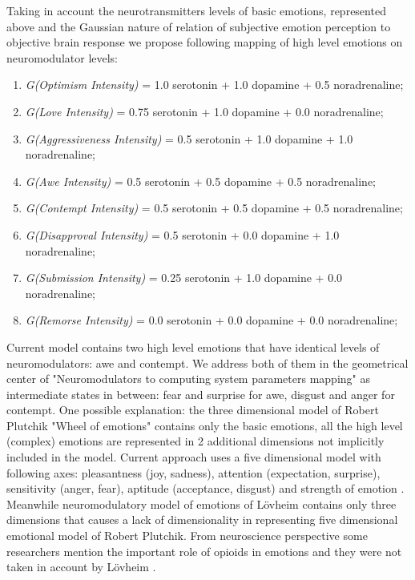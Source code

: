 Taking in account the neurotransmitters levels of basic emotions, represented above and the Gaussian nature of relation of subjective emotion perception to objective brain response \cite{senticcomputing, neuralcorrelatesofhate, emotionsbraintorobot} we propose following mapping of high level emotions on neuromodulator levels:

\begin{enumerate}
 \item  \emph{G(Optimism Intensity)} = 1.0 serotonin  + 1.0 dopamine + 0.5 noradrenaline;
 \item  \emph{G(Love Intensity)} = 0.75 serotonin + 1.0 dopamine + 0.0 noradrenaline;
 \item  \emph{G(Aggressiveness Intensity)} = 0.5 serotonin + 1.0 dopamine + 1.0 noradrenaline;
 \item  \emph{G(Awe Intensity)} = 0.5 serotonin + 0.5 dopamine + 0.5 noradrenaline;
 \item  \emph{G(Contempt Intensity)} = 0.5 serotonin + 0.5 dopamine + 0.5 noradrenaline;
 \item  \emph{G(Disapproval Intensity)} = 0.5 serotonin + 0.0 dopamine + 1.0 noradrenaline;
 \item  \emph{G(Submission Intensity)} = 0.25 serotonin + 1.0 dopamine + 0.0 noradrenaline;
 \item  \emph{G(Remorse Intensity)} = 0.0 serotonin + 0.0 dopamine + 0.0 noradrenaline;
\end{enumerate}

Current model contains two high level emotions that have identical levels of neuromodulators: awe and contempt. We address both of them in the geometrical center of "Neuromodulators to computing system parameters mapping" as intermediate states in between: fear and surprise for awe, disgust and anger for contempt. One possible explanation: the three dimensional model of Robert Plutchik "Wheel of emotions" contains only the basic emotions, all the high level (complex) emotions are represented in 2 additional dimensions not implicitly included in the model. Current approach uses a five dimensional model with following axes: pleasantness (joy, sadness), attention (expectation, surprise), sensitivity (anger, fear), aptitude (acceptance, disgust) and strength of emotion \cite{senticcomputing, hourglass}. Meanwhile neuromodulatory model of emotions of L\"{o}vheim contains only three dimensions that causes a lack of dimensionality in representing five dimensional emotional model of Robert Plutchik. From neuroscience perspective some researchers mention the important role of opioids in emotions and they were not taken in account by L\"{o}vheim \cite{emotionsbraintorobot, neuromodulatory}.


